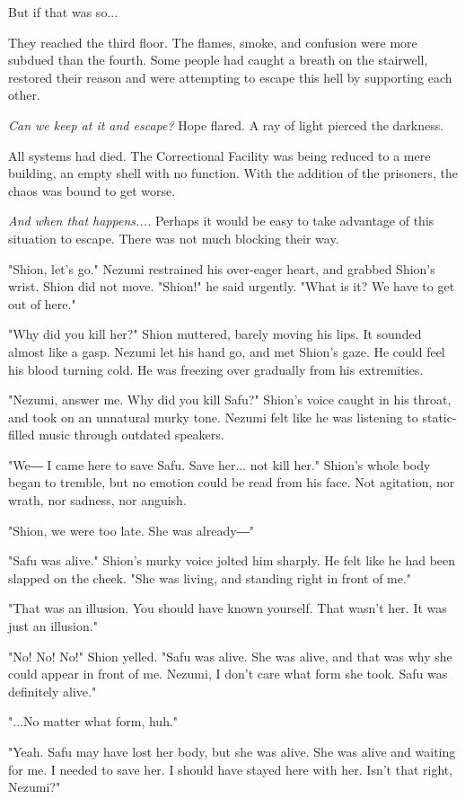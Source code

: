 But if that was so...

They reached the third floor. The flames, smoke, and confusion were more
subdued than the fourth. Some people had caught a breath on the
stairwell, restored their reason and were attempting to escape this hell
by supporting each other.

\emph{Can we keep at it and escape?} Hope flared. A ray of light pierced the
darkness.

All systems had died. The Correctional Facility was being reduced to a
mere building, an empty shell with no function. With the addition of the
prisoners, the chaos was bound to get worse.

\emph{And when that happens....} Perhaps it would be easy to take advantage of
this situation to escape. There was not much blocking their way.

"Shion, let's go." Nezumi restrained his over-eager heart, and grabbed
Shion's wrist. Shion did not move. "Shion!" he said urgently. "What is
it? We have to get out of here."

"Why did you kill her?" Shion muttered, barely moving his lips. It
sounded almost like a gasp. Nezumi let his hand go, and met Shion's
gaze. He could feel his blood turning cold. He was freezing over
gradually from his extremities.

"Nezumi, answer me. Why did you kill Safu?" Shion's voice caught in his
throat, and took on an unnatural murky tone. Nezumi felt like he was
listening to static-filled music through outdated speakers.

"We― I came here to save Safu. Save her... not kill her." Shion's whole
body began to tremble, but no emotion could be read from his face. Not
agitation, nor wrath, nor sadness, nor anguish.

"Shion, we were too late. She was already―"

"Safu was alive." Shion's murky voice jolted him sharply. He felt like
he had been slapped on the cheek. "She was living, and standing right in
front of me."

"That was an illusion. You should have known yourself. That wasn't her.
It was just an illusion."

"No! No! No!" Shion yelled. "Safu was alive. She was alive, and that was
why she could appear in front of me. Nezumi, I don't care what form she
took. Safu was definitely alive."

"...No matter what form, huh."

"Yeah. Safu may have lost her body, but she was alive. She was alive and
waiting for me. I needed to save her. I should have stayed here with
her. Isn't that right, Nezumi?"

